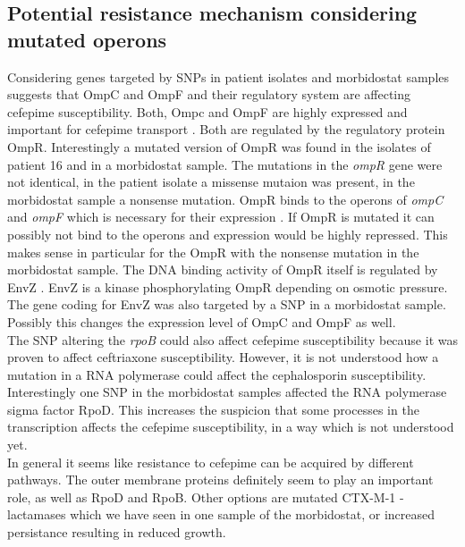 \subsection{Potential resistance mechanism considering mutated operons}
Considering genes targeted by SNPs in patient isolates and morbidostat samples suggests that OmpC and OmpF and their regulatory system are affecting cefepime susceptibility. Both, Ompc and OmpF are highly expressed and important for cefepime transport \cite{rampersaud_ompr_1994} \cite{masi_structure_2013}. Both are regulated by the regulatory protein OmpR. Interestingly a mutated version of OmpR was found in the isolates of patient 16 and in a morbidostat sample. The mutations in the \textit{ompR} gene were not identical, in the patient isolate a missense mutaion was present, in the morbidostat sample a nonsense mutation. OmpR binds to the operons of \textit{ompC} and \textit{ompF} which is necessary for their expression \cite{masi_structure_2013}. If OmpR is mutated it can possibly not bind to the operons and expression would be highly repressed. This makes sense in particular for the OmpR with the nonsense mutation in the morbidostat sample. The DNA binding activity of OmpR itself is regulated by EnvZ \cite{masi_structure_2013}. EnvZ is a kinase phosphorylating OmpR depending on osmotic pressure. The gene coding for EnvZ was also targeted by a SNP in a morbidostat sample. Possibly this changes the expression level of OmpC and OmpF as well. \\
The SNP altering the \textit{rpoB} could also affect cefepime susceptibility because it was proven to affect ceftriaxone susceptibility. However, it is not understood how a mutation in a RNA polymerase could affect the cephalosporin susceptibility. Interestingly one SNP in the morbidostat samples affected the RNA polymerase sigma factor RpoD. This increases the suspicion that some processes in the transcription affects the cefepime susceptibility, in a way which is not understood yet. \\
In general it seems like resistance to cefepime can be acquired by different pathways. The outer membrane proteins definitely seem to play an important role, as well as RpoD and RpoB. Other options are mutated CTX-M-1 \textbeta-lactamases which we have seen in one sample of the morbidostat, or increased persistance resulting in reduced growth. 
